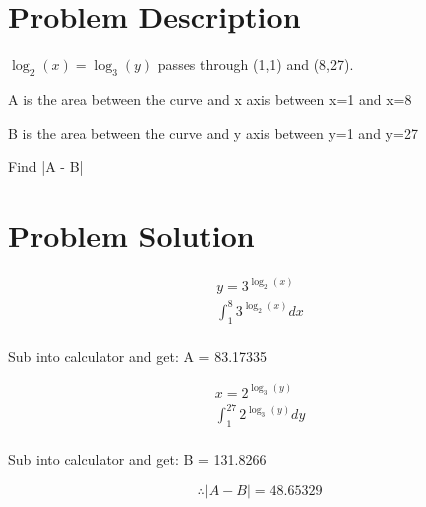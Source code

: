 \documentclass{article}
\begin{document}
\section{Problem Description}
\huge
$\log_2(x) = \log_3(y)$ passes through (1,1) and (8,27).

A is the area between the curve and x axis between x=1 and x=8

B is the area between the curve and y axis between y=1 and y=27

Find |A - B|
\section{Problem Solution}

\begin{align*}
    y = 3^{\log_2(x)}\\
    \int^8_1 3^{\log_2(x)}dx\\
\end{align*}

Sub into calculator and get: A = 83.17335

\begin{align*}
    x = 2^{\log_3(y)}\\
    \int^27_1 2^{\log_3(y)}dy\\
\end{align*}

Sub into calculator and get: B = 131.8266

\[
    \therefore |A - B| = 48.65329
\]
\end{document}
